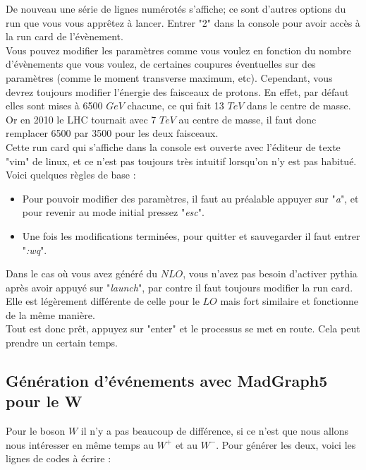 \documentclass[a4paper]{report}
\begin{document}
De nouveau une série de lignes numérotés s'affiche; ce sont d'autres options du run que vous vous apprêtez à lancer. Entrer "2" dans la console pour avoir accès à la run card de l'évènement. \\

Vous pouvez modifier les paramètres comme vous voulez en fonction du nombre d'évènements que vous voulez, de certaines coupures éventuelles sur des paramètres (comme le moment transverse maximum, etc). Cependant, vous devrez toujours modifier l'énergie des faisceaux de protons. En effet, par défaut elles sont mises à 6500 $GeV$ chacune, ce qui fait 13 $TeV$ dans le centre de masse. Or en 2010 le LHC tournait avec 7 $TeV$ au centre de masse, il faut donc remplacer 6500 par 3500 pour les deux faisceaux. \\

Cette run card qui s'affiche dans la console est ouverte avec l'éditeur de texte "vim" de linux, et ce n'est pas toujours très intuitif lorsqu'on n'y est pas habitué. Voici quelques règles de base : \\

\begin{itemize}

\item Pour pouvoir modifier des paramètres, il faut au préalable appuyer sur "\textit{a}", et pour revenir au mode initial pressez "\textit{esc}". \\
\item Une fois les modifications terminées, pour quitter et sauvegarder il faut entrer "\textit{:wq}". 
\end{itemize}
\w

Dans le cas où vous avez généré du $NLO$, vous n'avez pas besoin d'activer pythia après avoir appuyé sur "\textit{launch}", par contre il faut toujours modifier la run card. Elle est légèrement différente de celle pour le $LO$ mais fort similaire et fonctionne de la même manière. \\

Tout est donc prêt, appuyez sur "enter" et le processus se met en route. Cela peut prendre un certain temps.

\subsection{Génération d'événements avec MadGraph5 pour le W}

Pour le boson $W$ il n'y a pas beaucoup de différence, si ce n'est que nous allons nous intéresser en même temps au $W^+$ et au $W^-$. Pour générer les deux, voici les lignes de codes à écrire : 
\end{document}
